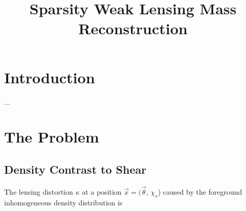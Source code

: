\documentclass[twocolumn]{aastex62}
\begin{document}
\title{Sparsity Weak Lensing Mass Reconstruction}




\begin{abstract}

\end{abstract}

\section{Introduction}
...
\section{The Problem}

\subsection{Density Contrast to Shear}
The lensing distortion $\kappa$ at a position $\vec{x}=(\vec{\theta}$, $\chi_s$) caused by the foreground inhomogeneous density distribution is
\end{document}
